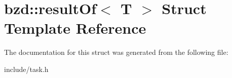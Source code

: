 \hypertarget{structbzd_1_1resultOf}{}\section{bzd\+:\+:result\+Of$<$ T $>$ Struct Template Reference}
\label{structbzd_1_1resultOf}


The documentation for this struct was generated from the following file\+:\begin{DoxyCompactItemize}
\item 
include/task.\+h\end{DoxyCompactItemize}
